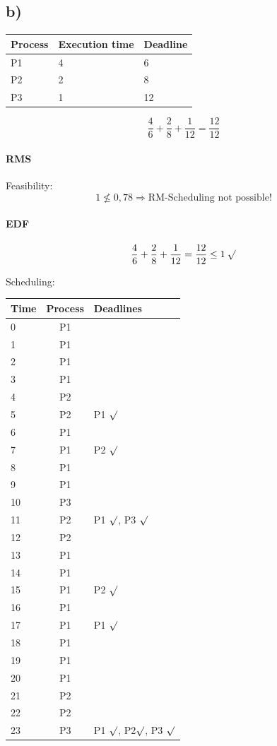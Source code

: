 \documentclass[a4paper,10pt]{scrartcl}
\begin{document}
\subsection{b)}
\begin{center}
\begin{tabular}{|l|l|l|}
\hline
\textbf{Process} & \textbf{Execution time} & \textbf{Deadline} \\ 
\hline 
P1 & 4 & 6 \\ 
 
P2 & 2 & 8 \\

P3 & 1 & 12 \\
\hline
\end{tabular} 
\end{center}
$$ \dfrac{4}{6}+ \dfrac{2}{8} + \dfrac{1}{12} = \dfrac{12}{12} $$

\paragraph{RMS} Feasibility:
$$ 1 \nleq 0,78 \Rightarrow \textrm{RM-Scheduling not possible!} $$
\paragraph{EDF}
$$ \dfrac{4}{6}+ \dfrac{2}{8} + \dfrac{1}{12} = \dfrac{12}{12} \leq 1 \: \surd$$

Scheduling:
\begin{center}
\begin{tabular}{|l|c|l|}
\hline 
\textbf{Time} & \textbf{Process} & \textbf{Deadlines} \\ 
\hline 
0 & P1 &  \\ 
1 & P1 &  \\ 
2 & P1 & \\ 
3 & P1 & \\ 
4 & P2 &  \\ 
5 & P2 & P1 $\surd$ \\ 
6 & P1 &  \\ 
7 & P1 & P2 $\surd$ \\ 
8 & P1 & \\ 
9 & P1 &  \\ 
10 &P3 &  \\ 
11 &P2 & P1 $\surd$, P3 $\surd$ \\ 
12 &P2 &  \\ 
13 &P1 &  \\ 
14 &P1 &  \\ 
15 &P1 & P2 $\surd$\\ 
16 &P1 &  \\ 
17 &P1 & P1 $\surd$ \\ 
18 &P1 &  \\ 
19 &P1 &  \\ 
20 &P1 &  \\ 
21 &P2 &  \\ 
22 &P2 &  \\ 
23 &P3 & P1 $\surd$, P2$\surd$, P3 $\surd$ \\ 
\hline 
\end{tabular} 
\end{center}
\end{document}
